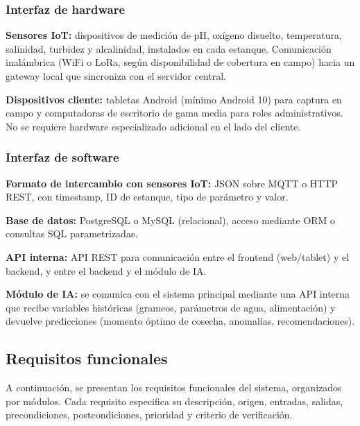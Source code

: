 \documentclass[11pt,a4paper]{article}
\begin{document}
\subsubsection{Interfaz de hardware}

\textbf{Sensores IoT:} dispositivos de medición de pH, oxígeno disuelto, temperatura, salinidad, turbidez y alcalinidad, instalados en cada estanque. Comunicación inalámbrica (WiFi o LoRa, según disponibilidad de cobertura en campo) hacia un gateway local que sincroniza con el servidor central.

\textbf{Dispositivos cliente:} tabletas Android (mínimo Android 10) para captura en campo y computadoras de escritorio de gama media para roles administrativos. No se requiere hardware especializado adicional en el lado del cliente.

\subsubsection{Interfaz de software}

\textbf{Formato de intercambio con sensores IoT:} JSON sobre MQTT o HTTP REST, con timestamp, ID de estanque, tipo de parámetro y valor.

\textbf{Base de datos:} PostgreSQL o MySQL (relacional), acceso mediante ORM o consultas SQL parametrizadas.

\textbf{API interna:} API REST para comunicación entre el frontend (web/tablet) y el backend, y entre el backend y el módulo de IA.

\textbf{Módulo de IA:} se comunica con el sistema principal mediante una API interna que recibe variables históricas (grameos, parámetros de agua, alimentación) y devuelve predicciones (momento óptimo de cosecha, anomalías, recomendaciones).

\subsection{Requisitos funcionales}
A continuación, se presentan los requisitos funcionales del sistema, organizados por módulos. Cada requisito especifica su descripción, origen, entradas, salidas, precondiciones, postcondiciones, prioridad y criterio de verificación.
\end{document}
